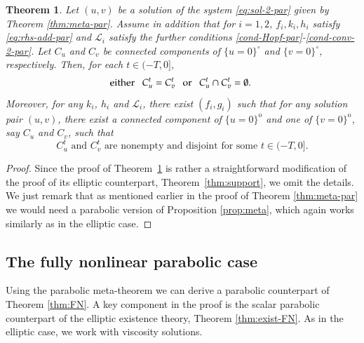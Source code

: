 \documentclass[11pt,oneside,english]{amsart}
\newcommand{\cL}{{\mathcal L}}
\numberwithin{equation}{section}
\newtheorem{theorem}{Theorem}
\theoremstyle{plain}
\numberwithin{equation}{section}
\begin{document}
\begin{theorem}\label{thm:support-par}
Let $(u,v)$ be a solution of the system \eqref{eq:sol-2-par} given by Theorem \ref{thm:meta-par}.
Assume in addition that for  $i=1,2$, $f_i, k_i,h_i$ satisfy \eqref{eq:rhs-add-par} and $\cL_i$ satisfy the further conditions \ref{cond-Hopf-par}-\ref{cond-conv-2-par}.  Let $C_u$ and $C_v$ be connected components of $\{u=0\}^\circ$ and $\{v=0\}^\circ$, respectively. 
    Then, for each $t\in(-T,0]$,
    \begin{align}\label{eq:dichotomy-par} 
        \text{either\,\,\, $C_u^t=C_v^t$ \,\,\,or \,\,\,$C_u^t\cap C_v^t=\emptyset$.   }
    \end{align}
    Moreover, for any $k_i$, $h_i$ and $\cL_i$, there exist $(f_i,g_i)$ such that for any solution pair  $(u,v)$, there exist a connected component of $\{u=0\}^{\mathrm{o}}$ and one of $\{v=0\}^{\mathrm{o}}$, say $C_u$ and $C_v$, such that
    \begin{equation}\label{eq:disjoint-par} 
        C_u^t \text{ and } C_v^t \text{ are nonempty and disjoint for some } t\in(-T,0].
    \end{equation}
\end{theorem}



\begin{proof} 
Since the proof of Theorem~\ref{thm:support-par} is rather a straightforward modification of the proof of its elliptic counterpart, Theorem~\ref{thm:support}, we omit the details. We just remark that as mentioned earlier in the proof of Theorem \ref{thm:meta-par} we would need a parabolic version of 
 Proposition \ref{prop:meta}, which again works similarly as in the elliptic case.
\end{proof}




\subsection{The fully nonlinear parabolic case}
\label{sec:FN-par}


Using the parabolic meta-theorem we can derive a parabolic counterpart of Theorem \ref{thm:FN}. 
A key component in the proof is the  scalar parabolic counterpart of the elliptic existence theory, Theorem \ref{thm:exist-FN}. 
As in the elliptic case, we work with viscosity solutions.
\end{document}
